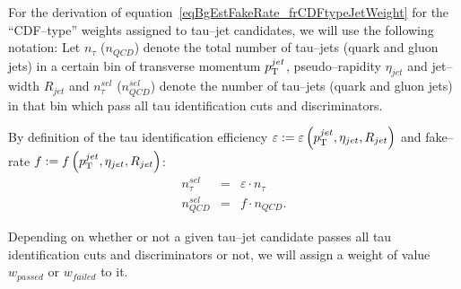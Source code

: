 For the derivation of equation~\ref{eqBgEstFakeRate_frCDFtypeJetWeight} for the
``CDF--type'' weights assigned to tau--jet candidates, we will use the following
notation: Let $n_{\tau}$ ($n_{QCD}$) denote the total number of tau--jets (quark
and gluon jets) in a certain bin of transverse momentum $p_{\mathrm{T}}^{jet}$,
pseudo--rapidity $\eta_{jet}$ and jet--width $R_{jet}$ and $n_{\tau}^{sel}$
($n_{QCD}^{sel}$) denote the number of tau--jets (quark and gluon jets) in that
bin which pass all tau identification cuts and discriminators.

By definition of the tau identification efficiency $\varepsilon := \varepsilon
\left( p_{\mathrm{T}}^{jet}, \eta_{jet}, R_{jet} \right)$ and fake--rate $f := f \left(
p_{\mathrm{T}}^{jet}, \eta_{jet}, R_{jet} \right)$:
\begin{eqnarray}
n_{\tau}^{sel} & = & \varepsilon \cdot n_{\tau} \nonumber \\
n_{QCD}^{sel} & = & f \cdot n_{QCD}.
\label{eqBgEstFakeRate_eff_and_frDef}
\end{eqnarray}

Depending on whether or not a given tau--jet candidate passes all tau
identification cuts and discriminators or not, we will assign a weight of value
$w_{passed}$ or $w_{failed}$ to it.

